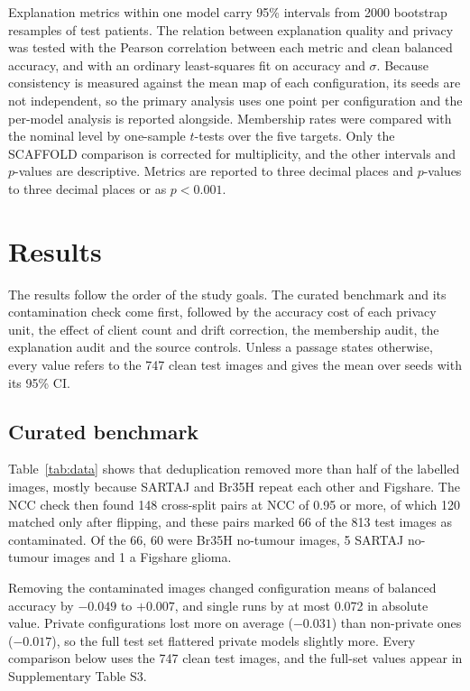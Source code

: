 \documentclass[preprint,12pt]{elsarticle}
\begin{document}
Explanation metrics within one model carry 95\% intervals from 2000 bootstrap resamples of test patients. The
relation between explanation quality and privacy was tested with the Pearson correlation between each metric and clean
balanced accuracy, and with an ordinary least-squares fit on accuracy and $\sigma$. Because consistency is measured
against the mean map of each configuration, its seeds are not independent, so the primary analysis uses one point per
configuration and the per-model analysis is reported alongside. Membership rates were compared with the nominal level
by one-sample $t$-tests over the five targets. Only the SCAFFOLD comparison is corrected for multiplicity, and the
other intervals and $p$-values are descriptive. Metrics are reported to three decimal places and $p$-values to three
decimal places or as $p<0.001$.

\section{Results}\label{sec:results}
The results follow the order of the study goals. The curated benchmark and its contamination check come first,
followed by the accuracy cost of each privacy unit, the effect of client count and drift correction, the membership
audit, the explanation audit and the source controls. Unless a passage states otherwise, every value refers to the 747
clean test images and gives the mean over seeds with its 95\% CI.

\subsection{Curated benchmark}
Table~\ref{tab:data} shows that deduplication removed more than half of the labelled images, mostly because SARTAJ and
Br35H repeat each other and Figshare. The NCC check then found 148 cross-split pairs at NCC of 0.95 or more, of which
120 matched only after flipping, and these pairs marked 66 of the 813 test images as contaminated. Of the 66, 60 were
Br35H no-tumour images, 5 SARTAJ no-tumour images and 1 a Figshare glioma.

Removing the contaminated images changed configuration means of balanced accuracy by $-0.049$ to $+0.007$, and single
runs by at most 0.072 in absolute value. Private configurations lost more on average ($-0.031$) than non-private ones
($-0.017$), so the full test set flattered private models slightly more. Every comparison below uses the 747 clean test
images, and the full-set values appear in Supplementary Table S3.
\end{document}
